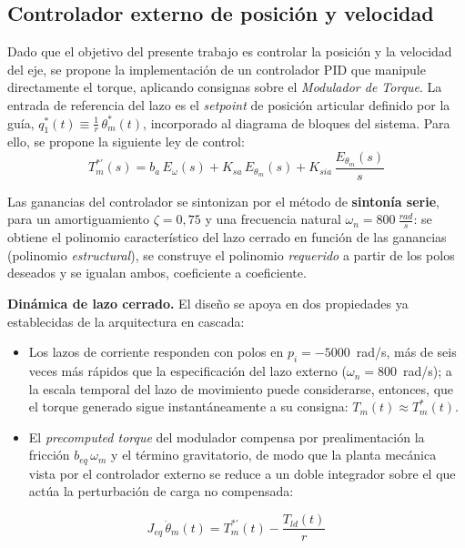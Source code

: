 \documentclass[12pt, a4paper,journal, onecolumn, compsoc]{IEEEtran}
\begin{document}
\subsection{Controlador externo de posición y velocidad}

Dado que el objetivo del presente trabajo es controlar la posición y la velocidad del eje, se propone la implementación de un controlador PID que manipule directamente el torque, aplicando consignas sobre el \textit{Modulador de Torque}. La entrada de referencia del lazo es el \textit{setpoint} de posición articular definido por la guía, $q_1^*(t) \equiv \frac{1}{r}\,\theta_m^*(t)$, incorporado al diagrama de bloques del sistema. Para ello, se propone la siguiente ley de control:
\begin{equation}
    T_m^{*\prime}(s)= b_a\,E_\omega(s) + K_{sa}\,E_{\theta_m}(s)+K_{sia}\,\frac{E_{\theta_m}(s)}{s}
    \label{eq:ley_pid_522}
\end{equation}

Las ganancias del controlador se sintonizan por el método de \textbf{sintonía serie}, para un amortiguamiento $\zeta = 0{,}75$ y una frecuencia natural $\omega_n = 800\ \frac{rad}{s}$: se obtiene el polinomio característico del lazo cerrado en función de las ganancias (polinomio \emph{estructural}), se construye el polinomio \emph{requerido} a partir de los polos deseados y se igualan ambos, coeficiente a coeficiente.

\textbf{Dinámica de lazo cerrado.} El diseño se apoya en dos propiedades ya establecidas de la arquitectura en cascada:
\begin{itemize}
    \item Los lazos de corriente responden con polos en $p_i=-5000$~rad/s, más de seis veces más rápidos que la especificación del lazo externo ($\omega_n=800$~rad/s); a la escala temporal del lazo de movimiento puede considerarse, entonces, que el torque generado sigue instantáneamente a su consigna: $T_m(t) \approx T_m^{*}(t)$.
    \item El \textit{precomputed torque} del modulador compensa por prealimentación la fricción $b_{eq}\,\omega_m$ y el término gravitatorio, de modo que la planta mecánica vista por el controlador externo se reduce a un doble integrador sobre el que actúa la perturbación de carga no compensada:
\end{itemize}
\begin{equation}
    J_{eq}\,\ddot{\theta}_m(t) = T_m^{*\prime}(t) - \frac{T_{ld}(t)}{r}
    \label{eq:planta_externa_522}
\end{equation}
\end{document}
